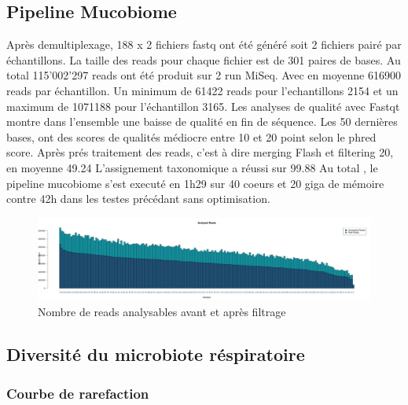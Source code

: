 \documentclass[12pt,a4paper]{article}
\begin{document}
\subsection{Pipeline Mucobiome}
Après demultiplexage, 188 x 2 fichiers fastq ont été généré soit 2 fichiers pairé par échantillons.
La taille des reads pour chaque fichier est de 301 paires de bases.
Au total 115’002’297 reads ont été produit sur 2 run MiSeq. Avec en moyenne 616900 reads par échantillon. Un minimum de 61422 reads pour l’echantillons 2154 et un maximum de 1071188 pour l’échantillon 3165.
Les analyses de qualité avec Fastqt montre dans l’ensemble une baisse de qualité en fin de séquence. Les 50 dernières bases, ont des scores de qualités médiocre entre 10 et 20 point selon le phred score.
Après prés traitement des reads, c’est à dire merging Flash et filtering 20, en moyenne 49.24 %
L’assignement taxonomique a réussi sur 99.88%
Au total , le pipeline mucobiome s’est executé en 1h29 sur 40 coeurs et 20 giga de mémoire contre 42h dans les testes précédant sans optimisation.

\begin{figure}[ht]
\begin{center}
\includegraphics[scale=0.25]{img/pipeline.png}\hfill
\end{center}
\caption{Nombre de reads analysables avant et après filtrage}
\label{all}
\end{figure}




\subsection{Diversité du microbiote réspiratoire}

\subsubsection{Courbe de rarefaction}
\end{document}
